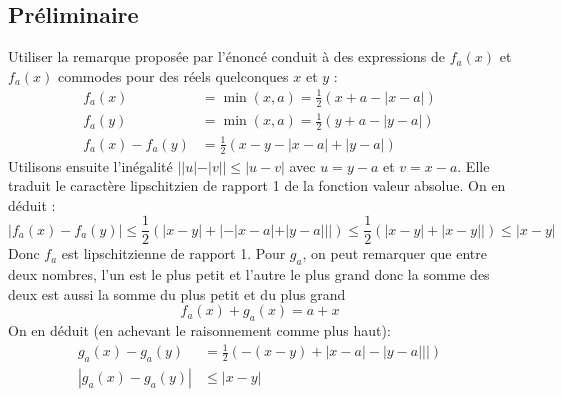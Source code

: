 \subsection*{Préliminaire}
Utiliser la remarque proposée par l'énoncé conduit à des expressions de $f_a(x)$ et $f_a(x)$ commodes pour des réels quelconques $x$ et $y$ :
\begin{align*}
 f_a(x)&=\min(x,a)=\frac{1}{2}(x+a-|x-a|)\\
f_a(y)&=\min(x,a)=\frac{1}{2}(y+a-|y-a|)\\
f_a(x)-f_a(y)&=\frac{1}{2}(x-y-|x-a|+|y-a|)
\end{align*}
Utilisons ensuite l'inégalité $||u|-|v||\leq |u-v|$  avec $u=y-a$ et $v=x-a$. Elle traduit le caractère lipschitzien de rapport 1 de la fonction valeur absolue. On en déduit :
\begin{displaymath}
 |f_a(x)-f_a(y)|\leq \frac{1}{2}\left( |x-y|+|-|x-a|+|y-a|||\right) 
\leq \frac{1}{2}\left( |x-y|+|x-y||\right)\leq |x-y| 
\end{displaymath}
Donc $f_a$ est lipschitzienne de rapport 1. Pour $g_a$, on peut remarquer que entre deux nombres, l'un est le plus petit et l'autre le plus grand donc la somme des deux est aussi la somme du plus petit et du plus grand 
\begin{displaymath}
 f_a(x)+g_a(x)=a+x
\end{displaymath}
On en déduit (en achevant le raisonnement comme plus haut):
\begin{align*}
 g_a(x)-g_a(y)&= \frac{1}{2}( -(x-y)+|x-a|-|y-a|||)\\
|g_a(x)-g_a(y)|&\leq |x-y|
\end{align*}

